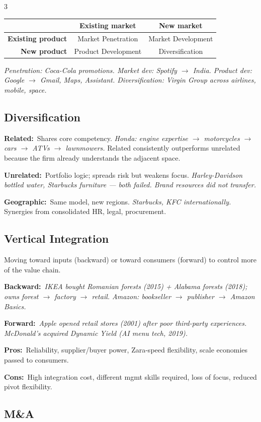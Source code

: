 \documentclass[7.6pt,letterpaper]{article}
\newcommand{\T}[1]{\textbf{\color{navy}#1}}
\newcommand{\kk}[2]{\noindent\T{#1}\ #2\par}
\newcommand{\eg}[1]{\textit{\color{mid}#1}}
\newcommand{\sh}{\rowcolor{strip}}
\newcommand{\ctab}[1]{{\fontsize{6.2pt}{7pt}\selectfont\setlength{\tabcolsep}{2.5pt}#1}}
\begin{document}
\begin{multicols}{3}
\ctab{\begin{tabular}{@{}r|cc@{}}
\sh & \T{Existing market} & \T{New market} \\
\hline
\T{Existing product} & Market Penetration & Market Development \\
\T{New product} & Product Development & Diversification \\
\end{tabular}}

\eg{Penetration: Coca-Cola promotions. Market dev: Spotify $\to$ India. Product dev: Google $\to$ Gmail, Maps, Assistant. Diversification: Virgin Group across airlines, mobile, space.}

\subsection{Diversification}

\kk{Related:}{Shares core competency. \eg{Honda: engine expertise $\to$ motorcycles $\to$ cars $\to$ ATVs $\to$ lawnmowers.} Related consistently outperforms unrelated because the firm already understands the adjacent space.}
\kk{Unrelated:}{Portfolio logic; spreads risk but weakens focus. \eg{Harley-Davidson bottled water, Starbucks furniture --- both failed. Brand resources did not transfer.}}
\kk{Geographic:}{Same model, new regions. \eg{Starbucks, KFC internationally.} Synergies from consolidated HR, legal, procurement.}

\subsection{Vertical Integration}

Moving toward inputs (backward) or toward consumers (forward) to control more of the value chain.

\kk{Backward:}{\eg{IKEA bought Romanian forests (2015) + Alabama forests (2018); owns forest $\to$ factory $\to$ retail. Amazon: bookseller $\to$ publisher $\to$ Amazon Basics.}}
\kk{Forward:}{\eg{Apple opened retail stores (2001) after poor third-party experiences. McDonald's acquired Dynamic Yield (AI menu tech, 2019).}}
\kk{Pros:}{Reliability, supplier/buyer power, Zara-speed flexibility, scale economies passed to consumers.}
\kk{Cons:}{High integration cost, different mgmt skills required, loss of focus, reduced pivot flexibility.}

\subsection{M\&A}


\end{multicols}
\end{document}
